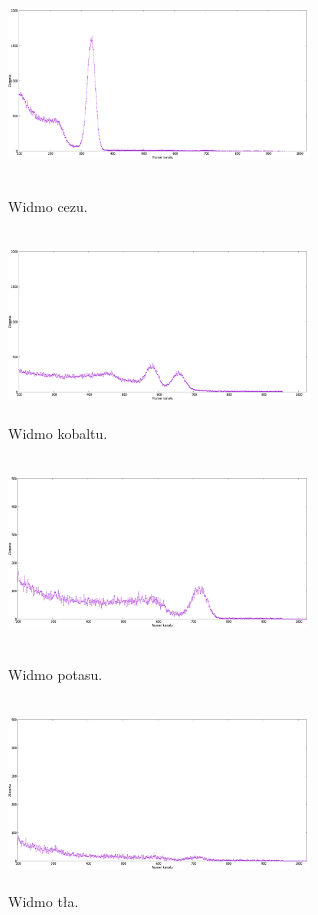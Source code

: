\documentclass[10pt,a4paper]{article}
\begin{document}
\begin{figure}[h!]
\centering
\begin{minipage}{0.5\textwidth}
  \centering
  \includegraphics[width=8cm, height=5cm ]{rap14rys1} 
\caption{Widmo cezu.}
\end{minipage}%
\begin{minipage}{0.5\textwidth}
  \centering
  \includegraphics[width=8cm, height=5cm ]{rap14rys2} 
\caption{Widmo kobaltu.}
\end{minipage}
\end{figure}
\begin{figure}[h!]
\centering
\begin{minipage}{0.5\textwidth}
  \centering
  \includegraphics[width=8cm, height=5cm ]{rap14rys31} 
\caption{Widmo potasu.}
\end{minipage}%
\begin{minipage}{0.5\textwidth}
  \centering
  \includegraphics[width=8cm, height=5cm ]{rap14rys32} 
\caption{Widmo tła.}
\end{minipage}
\end{figure}
\end{document}
